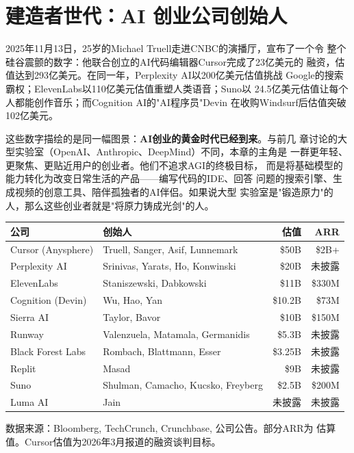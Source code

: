 
\chapter{建造者世代：AI 创业公司创始人}
\label{ch:founders}


2025年11月13日，25岁的Michael Truell走进CNBC的演播厅，宣布了一个令
整个硅谷震颤的数字：他联合创立的AI代码编辑器Cursor完成了23亿美元的
融资，估值达到293亿美元。在同一年，Perplexity AI以200亿美元估值挑战
Google的搜索霸权；ElevenLabs以110亿美元估值重塑人类语音；Suno以
24.5亿美元估值让每个人都能创作音乐；而Cognition AI的"AI程序员"Devin
在收购Windsurf后估值突破102亿美元。

这些数字描绘的是同一幅图景：\textbf{AI创业的黄金时代已经到来}。与前几
章讨论的大型实验室（OpenAI、Anthropic、DeepMind）不同，本章的主角是
一群更年轻、更聚焦、更贴近用户的创业者。他们不追求AGI的终极目标，
而是将基础模型的能力转化为改变日常生活的产品——编写代码的IDE、回答
问题的搜索引擎、生成视频的创意工具、陪伴孤独者的AI伴侣。如果说大型
实验室是"锻造原力"的人，那么这些创业者就是"将原力铸成光剑"的人。

\begin{corebox}[AI 创业公司估值速览（截至2026年3月）]
\small
\begin{tabularx}{\textwidth}{l l r r}
\toprule
\rowcolor{figLightGray}
\textbf{公司} & \textbf{创始人} & \textbf{估值} & \textbf{ARR} \\
\midrule
Cursor (Anysphere)  & Truell, Sanger, Asif, Lunnemark  & \$50B   & \$2B+ \\
Perplexity AI       & Srinivas, Yarats, Ho, Konwinski  & \$20B   & 未披露 \\
ElevenLabs          & Staniszewski, Dabkowski          & \$11B   & \$330M \\
Cognition (Devin)   & Wu, Hao, Yan                     & \$10.2B & \$73M \\
Sierra AI           & Taylor, Bavor                    & \$10B   & \$150M \\
Runway              & Valenzuela, Matamala, Germanidis & \$5.3B  & 未披露 \\
Black Forest Labs   & Rombach, Blattmann, Esser        & \$3.25B & 未披露 \\
Replit               & Masad                            & \$9B    & 未披露 \\
Suno                & Shulman, Camacho, Kucsko, Freyberg & \$2.5B & \$200M \\
Luma AI             & Jain                             & 未披露   & 未披露 \\
\bottomrule
\end{tabularx}

\medskip
\noindent 数据来源：Bloomberg, TechCrunch, Crunchbase, 公司公告。部分ARR为
估算值。Cursor估值为2026年3月报道的融资谈判目标。
\end{corebox}

